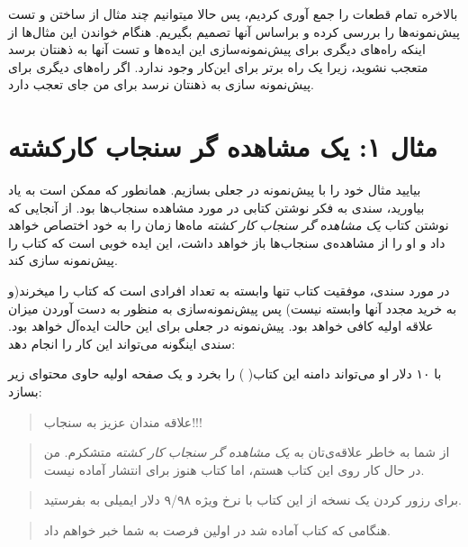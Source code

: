 بالاخره تمام قطعات را جمع آوری کردیم، پس حالا میتوانیم چند مثال از ساختن
و تست پیش‌نمونه‌ها را بررسی کرده و براساس آنها تصمیم بگیریم. هنگام
خواندن این مثال‌ها از اینکه راه‌های دیگری برای پیش‌نمونه‌سازی این
ایده‌ها و تست آنها به ذهنتان برسد متعجب نشوید، زیرا یک راه برتر برای
این‌کار وجود ندارد. اگر راه‌های دیگری برای پیش‌نمونه سازی به ذهنتان نرسد
برای من جای تعجب دارد.

\section{مثال ۱: یک مشاهده گر سنجاب
کارکشته}\label{ux645ux62bux627ux644-ux6ccux6a9-ux645ux634ux627ux647ux62fux647-ux6afux631-ux633ux646ux62cux627ux628-ux6a9ux627ux631ux6a9ux634ux62aux647}

بیایید مثال خود را با پیش‌نمونه در جعلی بسازیم. همانطور که ممکن است به
یاد بیاورید، سندی به فکر نوشتن کتابی در مورد مشاهده سنجاب‌ها بود. از
آنجایی که نوشتن کتاب \emph{یک مشاهده گر سنجاب کار کشته} ماه‌ها زمان را
به خود اختصاص خواهد داد و او را از مشاهده‌ی سنجاب‌ها باز خواهد داشت، این
ایده خوبی است که کتاب را پیش‌نمونه سازی کند.

در مورد سندی، موفقیت کتاب تنها وابسته به تعداد افرادی است که کتاب را
میخرند(و به خرید مجدد آنها وابسته نیست) پس پیش‌نمونه‌سازی به منظور به
دست آوردن میزان علاقه اولیه کافی خواهد بود. پیش‌نمونه در جعلی برای این
حالت ایده‌آل خواهد بود. سندی اینگونه می‌تواند این کار را انجام دهد:

با ۱۰ دلار او می‌تواند دامنه این کتاب(
 ) را بخرد و یک صفحه اولیه حاوی
محتوای زیر بسازد:

\begin{quote}
علاقه مندان عزیز به سنجاب!!!
\end{quote}

\begin{quote}
از شما به خاطر علاقه‌ی‌تان به \emph{یک مشاهده گر سنجاب کار کشته} متشکرم.
من در حال کار روی این کتاب هستم، اما کتاب هنوز برای انتشار آماده نیست.
\end{quote}

\begin{quote}
برای رزور کردن یک نسخه از این کتاب با نرخ ویژه ۹/۹۸ دلار ایمیلی به
 بفرستید.
\end{quote}

\begin{quote}
هنگامی که کتاب آماده شد در اولین فرصت به شما خبر خواهم داد.
\end{quote}

